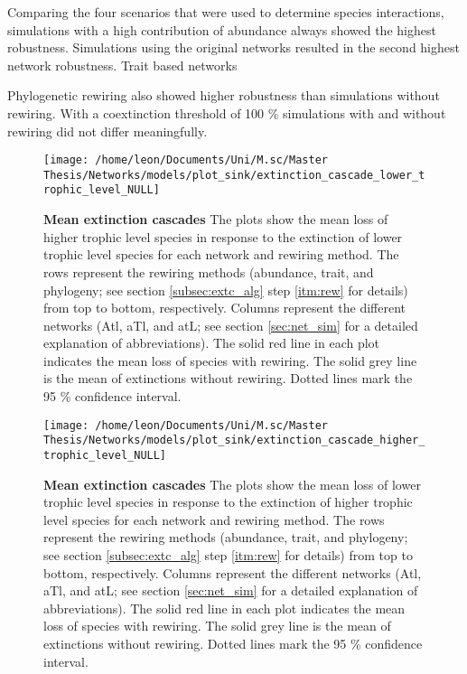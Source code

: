 \documentclass[12pt,a4paper]{article}
\begin{document}
Comparing the four scenarios that were used to determine species interactions, simulations with a high contribution of abundance always showed the highest robustness. Simulations using the original networks resulted in the second highest network robustness. Trait based networks 



Phylogenetic rewiring also showed higher robustness than simulations without rewiring. With a coextinction threshold of 100 \% simulations with and without rewiring did not differ meaningfully.

\begin{figure}[H]
	 \texttt{[image: /home/leon/Documents/Uni/M.sc/Master Thesis/Networks/models/plot\_sink/extinction\_cascade\_lower\_trophic\_level\_NULL]}
	 \caption{\textbf{Mean extinction cascades} The plots show the mean loss of higher trophic level species in response to the extinction of lower trophic level species for each network and rewiring method. The rows represent the rewiring methods (abundance, trait, and phylogeny; see section \ref{subsec:extc_alg} step \ref{itm:rew} for details) from top to bottom, respectively. Columns represent the different networks (Atl, aTl, and atL; see section \ref{sec:net_sim} for a detailed explanation of abbreviations). The solid red line in each plot indicates the mean loss of species with rewiring. The solid grey line is the mean of extinctions without rewiring. Dotted lines mark the 95 \% confidence interval.}
	 \label{fig:extc_sims_lower}
\end{figure}

\begin{figure}[H]
	 \texttt{[image: /home/leon/Documents/Uni/M.sc/Master Thesis/Networks/models/plot\_sink/extinction\_cascade\_higher\_trophic\_level\_NULL]}
	 \caption{\textbf{Mean extinction cascades} The plots show the mean loss of lower trophic level species in response to the extinction of higher trophic level species for each network and rewiring method. The rows represent the rewiring methods (abundance, trait, and phylogeny; see section \ref{subsec:extc_alg} step \ref{itm:rew} for details) from top to bottom, respectively. Columns represent the different networks (Atl, aTl, and atL; see section \ref{sec:net_sim} for a detailed explanation of abbreviations). The solid red line in each plot indicates the mean loss of species with rewiring. The solid grey line is the mean of extinctions without rewiring. Dotted lines mark the 95 \% confidence interval.}
	 \label{fig:extc_sims_higher}
\end{figure}
\end{document}
